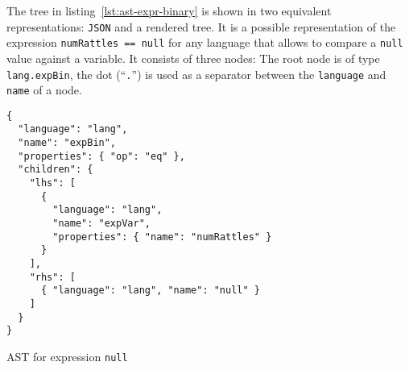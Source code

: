 \documentclass[sigconf,review=true]{acmart}
\begin{document}
The tree in listing~\ref{lst:ast-expr-binary} is shown in two equivalent representations: \texttt{JSON} and a rendered tree. It is a possible representation of the expression \texttt{numRattles == null} for any language that allows to compare a \texttt{null} value against a variable. It consists of three nodes: The root node is of type \texttt{lang.expBin}, the dot (\enquote{\texttt{.}}) is used as a separator between the \texttt{language} and \texttt{name} of a node.

\begin{listing}[H]
\begin{verbatim}
{
  "language": "lang",
  "name": "expBin",
  "properties": { "op": "eq" },
  "children": {
    "lhs": [
      {
        "language": "lang",
        "name": "expVar",
        "properties": { "name": "numRattles" }
      }
    ],
    "rhs": [
      { "language": "lang", "name": "null" }
    ]
  }
}
\end{verbatim}
\caption{AST for expression \texttt{null}}
\label{lst:ast-expr-binary}
\end{listing}
\end{document}
